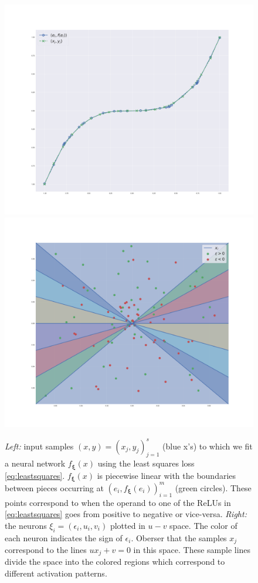 \begin{figure}
    \centering
    \includegraphics[width=\textwidth]{figures/knots2.pdf}
    \endminipage\hfill
    \includegraphics[width=\textwidth]{figures/phaseplot_eg.pdf}
    \endminipage\hfill
    
    
    \caption{\textit{Left:} input samples $(x, y) = (x_j, y_j)_{j=1}^s$ (blue x's) to which we fit a neural network $f_{\bm \xi}(x)$ using the least squares loss \eqref{eq:leastsquares}. $f_{\bm \xi}(x)$ is piecewise linear with the boundaries between pieces occurring at $(e_i, f_{\bm \xi}(e_i))_{i=1}^m$ (green circles). These points correspond to when the operand to one of the ReLUs in \eqref{eq:leastsquares} goes from positive to negative or vice-versa. \textit{Right:} the neurons $\xi_i = (\epsilon_i, u_i, v_i)$ plotted in $u-v$ space. The color of each neuron indicates the sign of $\epsilon_i$. Oberser that the samples $x_j$ correspond to the lines $u x_j + v = 0$ in this space. These sample lines divide the space into the colored regions which correspond to different activation patterns.}
    \label{fig:knots}
\end{figure}


